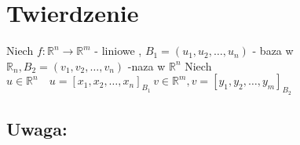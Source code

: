 \documentclass[11pt]{article}
\begin{document}
\section{Twierdzenie}
Niech $f: \mathbb{R}^n \to \mathbb{R}^m$ - liniowe , $B_1 = (u_1,u_2,\ldots,u_n)$ - baza w $\mathbb R_n, B_2 = (v_1,v_2,\ldots,v_n)$ -naza w $\mathbb{R}^n$ Niech $u \in \mathbb{R}^n \quad u = [x_1,x_2,\ldots,x_n]_{B_1} \, v \in \mathbb{R}^m, v = [y_1,y_2,\ldots,y_m]_{B_2}$

\subsection{Uwaga:}
\end{document}
